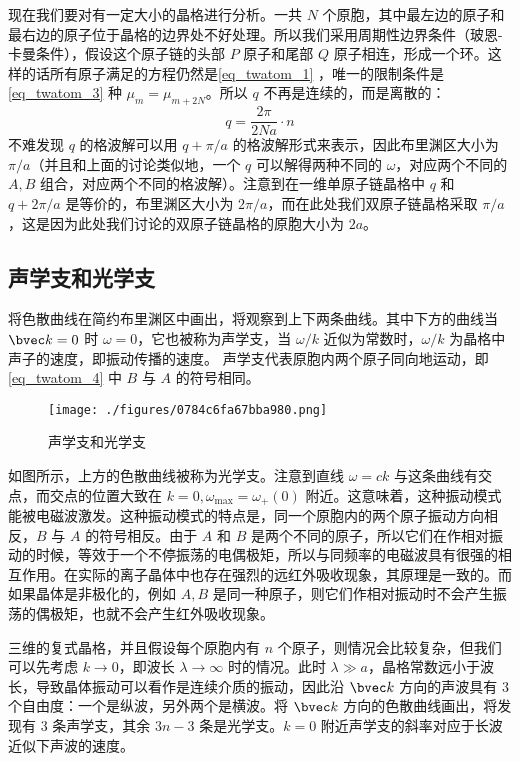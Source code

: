 现在我们要对有一定大小的晶格进行分析。一共 $N$ 个原胞，其中最左边的原子和最右边的原子位于晶格的边界处不好处理。所以我们采用周期性边界条件（玻恩-卡曼条件），假设这个原子链的头部 $P$ 原子和尾部 $Q$ 原子相连，形成一个环。这样的话所有原子满足的方程仍然是\autoref{eq_twatom_1} ，唯一的限制条件是 \autoref{eq_twatom_3} 种 $\mu_{m}=\mu_{m+2N}$。所以 $q$ 不再是连续的，而是离散的：
\begin{equation}
q=\frac{2\pi}{2Na} \cdot n
\end{equation}
不难发现 $q$ 的格波解可以用 $q+\pi/a$ 的格波解形式来表示，因此布里渊区大小为 $\pi/a$（并且和上面的讨论类似地，一个 $q$ 可以解得两种不同的 $\omega$，对应两个不同的 $A,B$ 组合，对应两个不同的格波解）。注意到在一维单原子链晶格中 $q$ 和 $q+2\pi/a$ 是等价的，布里渊区大小为 $2\pi/a$，而在此处我们双原子链晶格采取 $\pi/a$ ，这是因为此处我们讨论的双原子链晶格的原胞大小为 $2a$。
\subsection{声学支和光学支}
将色散曲线在简约布里渊区中画出，将观察到上下两条曲线。其中下方的曲线当 $\bvec k=0$ 时 $\omega=0$，它也被称为声学支，当 $\omega/k$ 近似为常数时，$\omega/k$ 为晶格中声子的速度，即振动传播的速度。 
声学支代表原胞内两个原子同向地运动，即\autoref{eq_twatom_4} 中 $B$ 与 $A$ 的符号相同。
\begin{figure}[ht]
\centering
\texttt{[image: ./figures/0784c6fa67bba980.png]}
\caption{声学支和光学支} \label{fig_twatom_2}
\end{figure}
如图所示，上方的色散曲线被称为光学支。注意到直线 $\omega=ck$ 与这条曲线有交点，而交点的位置大致在 $k=0,\omega_{\max}=\omega_+(0)$ 附近。这意味着，这种振动模式能被电磁波激发。这种振动模式的特点是，同一个原胞内的两个原子振动方向相反，$B$ 与 $A$ 的符号相反。由于 $A$ 和 $B$ 是两个不同的原子，所以它们在作相对振动的时候，等效于一个不停振荡的电偶极矩，所以与同频率的电磁波具有很强的相互作用。在实际的离子晶体中也存在强烈的远红外吸收现象，其原理是一致的。而如果晶体是非极化的，例如 $A,B$ 是同一种原子，则它们作相对振动时不会产生振荡的偶极矩，也就不会产生红外吸收现象。

三维的复式晶格，并且假设每个原胞内有 $n$ 个原子，则情况会比较复杂，但我们可以先考虑 $k\rightarrow 0$，即波长 $\lambda\rightarrow \infty$ 时的情况。此时 $\lambda\gg a$，晶格常数远小于波长，导致晶体振动可以看作是连续介质的振动，因此沿 $\bvec k$ 方向的声波具有 $3$ 个自由度：一个是纵波，另外两个是横波。将 $\bvec k$ 方向的色散曲线画出，将发现有 $3$ 条声学支，其余 $3n-3$ 条是光学支。$k=0$ 附近声学支的斜率对应于长波近似下声波的速度。